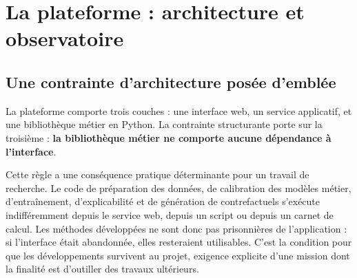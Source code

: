 \chapter{La plateforme : architecture et observatoire}
\label{ch:plateforme}


\section{Une contrainte d'architecture posée d'emblée}

La plateforme comporte trois couches : une interface web, un service applicatif, et une
bibliothèque métier en Python. La contrainte structurante porte sur la troisième :
\textbf{la bibliothèque métier ne comporte aucune dépendance à l'interface}.

Cette règle a une conséquence pratique déterminante pour un travail de recherche. Le code de
préparation des données, de calibration des modèles métier, d'entraînement, d'explicabilité et
de génération de contrefactuels s'exécute indifféremment depuis le service web, depuis un
script ou depuis un carnet de calcul. Les méthodes développées ne sont donc pas prisonnières de
l'application : si l'interface était abandonnée, elles resteraient utilisables. C'est la
condition pour que les développements survivent au projet, exigence explicite d'une mission dont
la finalité est d'outiller des travaux ultérieurs.

